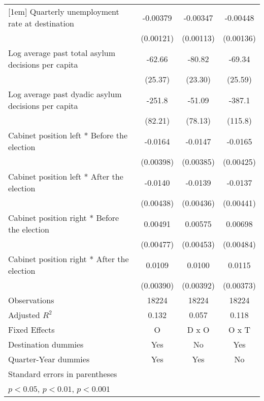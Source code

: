 \begin{table}[htbp]
\begin{tabular}{l*{3}{c}}
[1em]
Quarterly unemployment rate at destination&    -0.00379\sym{**} &    -0.00347\sym{**} &    -0.00448\sym{**} \\
                    &   (0.00121)         &   (0.00113)         &   (0.00136)         \\
[1em]
Log average past total asylum decisions per capita&      -62.66\sym{*}  &      -80.82\sym{**} &      -69.34\sym{**} \\
                    &     (25.37)         &     (23.30)         &     (25.59)         \\
[1em]
Log average past dyadic asylum decisions per capita&      -251.8\sym{**} &      -51.09         &      -387.1\sym{**} \\
                    &     (82.21)         &     (78.13)         &     (115.8)         \\
[1em]
Cabinet position left * Before the election&     -0.0164\sym{***}&     -0.0147\sym{***}&     -0.0165\sym{***}\\
                    &   (0.00398)         &   (0.00385)         &   (0.00425)         \\
[1em]
Cabinet position left * After the election&     -0.0140\sym{**} &     -0.0139\sym{**} &     -0.0137\sym{**} \\
                    &   (0.00438)         &   (0.00436)         &   (0.00441)         \\
[1em]
Cabinet position right * Before the election&     0.00491         &     0.00575         &     0.00698         \\
                    &   (0.00477)         &   (0.00453)         &   (0.00484)         \\
[1em]
Cabinet position right * After the election&      0.0109\sym{**} &      0.0100\sym{*}  &      0.0115\sym{**} \\
                    &   (0.00390)         &   (0.00392)         &   (0.00373)         \\
\hline
Observations        &       18224         &       18224         &       18224         \\
Adjusted \(R^{2}\)  &       0.132         &       0.057         &       0.118         \\
Fixed Effects       &           O         &       D x O         &       O x T         \\
Destination dummies &         Yes         &          No         &         Yes         \\
Quarter-Year dummies&         Yes         &         Yes         &          No         \\
\hline\hline
\multicolumn{4}{l}{\footnotesize Standard errors in parentheses}\\
\multicolumn{4}{l}{\footnotesize \sym{*} \(p<0.05\), \sym{**} \(p<0.01\), \sym{***} \(p<0.001\)}\\
\end{tabular}
\end{table}

